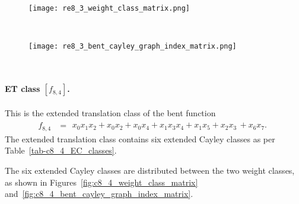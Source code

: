 \documentclass[12pt,a4paper]{article}
\begin{document}
\begin{figure}[!bhpt] %
\centering
\begin{minipage}{.48\textwidth}
  \centering
  \texttt{[image: re8\_3\_weight\_class\_matrix.png]}
  \label{fig:c8_3_weight_class_matrix}
\end{minipage}%
~~~~
\begin{minipage}{.48\textwidth}
  \centering
  \texttt{[image: re8\_3\_bent\_cayley\_graph\_index\_matrix.png]}
  \label{fig:c8_3_bent_cayley_graph_index_matrix}
\end{minipage}
\end{figure}
~
%
\paragraph*{ET class $[f_{8,4}]$.}
This is the extended translation class of the bent function
\small{}
\begin{align*}
f_{ 8 , 4 } &=
\begin{array}{l}
x_{0} x_{1} x_{2} + x_{0} x_{2} + x_{0} x_{4} + x_{1} x_{3} x_{4} + x_{1} x_{5} + x_{2} x_{3}\, +
x_{6} x_{7}.
\end{array}
\end{align*}
\normalsize{}
The extended translation class contains six extended Cayley classes as per Table~\ref{tab-c8_4_EC_classes}.

The six extended Cayley classes are distributed between the two weight classes,
as shown in Figures~\ref{fig:c8_4_weight_class_matrix} and~\ref{fig:c8_4_bent_cayley_graph_index_matrix}.
\end{document}
